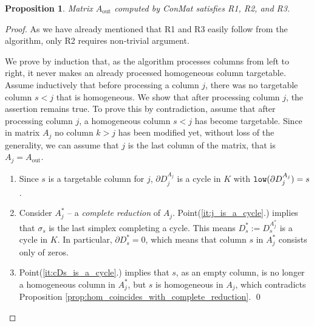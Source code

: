 \documentclass[a4paper,english,cleveref]{article}
\theoremstyle{plain}
\newtheorem{prop}{Proposition}[section]
\newcounter{li}
\DeclareMathOperator{\out}{out}
\newcommand{\compl}[1]{{#1}^*}
\newcommand{\low}{{\tt low}}
\begin{document}
\begin{prop}\label{prop:Aout_is_R2}
    Matrix $A_{\out}$ computed by {\sc ConMat} satisfies %
    \emph{R1}, \emph{R2}, and \emph{R3}.
\end{prop}
\begin{proof}
As we have already mentioned that R1 and R3 easily follow from the algorithm, only R2 requires non-trivial argument.

We prove by induction that, as the algorithm processes columns from left to right,
it never makes an already processed homogeneous column targetable.
Assume inductively that before processing a column $j$, there was no targetable column $s<j$ that is homogeneous. 
We show that after processing column $j$, the assertion remains true.
To prove this by contradiction, assume that after processing column $j$, a homogeneous column $s<j$ has become targetable.
Since in matrix $A_j$ no column $k>j$ has been modified yet, without loss of the generality, we can assume that $j$ is the last column of the matrix, that is $A_j=A_{\out}$.

\begin{enumerate}
    \item\label{it:j_is_a_cycle} Since $s$ is a targetable column for $j$, $\partial D_j^{A_j}$ is a cycle in $K$ with $\low(\partial D_j^{A_j})=s$.
    \item\label{it:cDs_is_a_cycle} Consider $\compl{A}_j$ -- a \emph{complete reduction} of $A_j$.
        Point(\ref{it:j_is_a_cycle}.) implies that $\sigma_s$ is the last simplex completing a cycle.
        This means $\compl{D}_s:=D_s^{\compl A_j}$ is a cycle in $K$. 
        In particular, $\partial\compl{D}_s=0$, which means that column $s$ in $\compl{A}_j$ consists only of zeros.
    \item Point(\ref{it:cDs_is_a_cycle}.) implies that $s$, as an empty column, is no longer a homogeneous column in $\compl{A}_j$, but $s$ is homogeneous in $A_j$, which contradicts Proposition \ref{prop:hom_coincides_with_complete_reduction}.
    \qed
\end{enumerate}
\end{proof}
\end{document}
